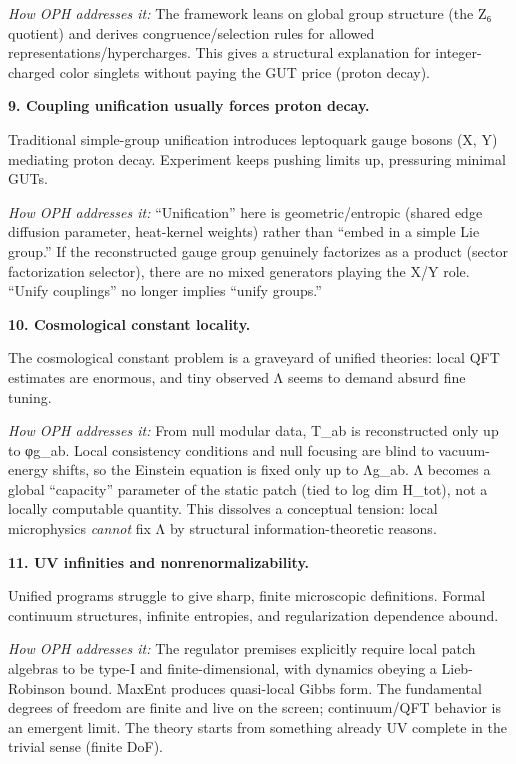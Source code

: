 \documentclass[11pt,a4paper]{article}
\theoremstyle{remark}
\begin{document}
\emph{How OPH addresses it:} The framework leans on global group structure (the Z₆ quotient) and derives congruence/selection rules for allowed representations/hypercharges. This gives a structural explanation for integer-charged color singlets without paying the GUT price (proton decay).

\textbf{9. Coupling unification usually forces proton decay.}

Traditional simple-group unification introduces leptoquark gauge bosons (X, Y) mediating proton decay. Experiment keeps pushing limits up, pressuring minimal GUTs.

\emph{How OPH addresses it:} ``Unification'' here is geometric/entropic (shared edge diffusion parameter, heat-kernel weights) rather than ``embed in a simple Lie group.'' If the reconstructed gauge group genuinely factorizes as a product (sector factorization selector), there are no mixed generators playing the X/Y role. ``Unify couplings'' no longer implies ``unify groups.''

\textbf{10. Cosmological constant locality.}

The cosmological constant problem is a graveyard of unified theories: local QFT estimates are enormous, and tiny observed Λ seems to demand absurd fine tuning.

\emph{How OPH addresses it:} From null modular data, T\_ab is reconstructed only up to φg\_ab. Local consistency conditions and null focusing are blind to vacuum-energy shifts, so the Einstein equation is fixed only up to Λg\_ab. Λ becomes a global ``capacity'' parameter of the static patch (tied to log dim H\_tot), not a locally computable quantity. This dissolves a conceptual tension: local microphysics \emph{cannot} fix Λ by structural information-theoretic reasons.

\textbf{11. UV infinities and nonrenormalizability.}

Unified programs struggle to give sharp, finite microscopic definitions. Formal continuum structures, infinite entropies, and regularization dependence abound.

\emph{How OPH addresses it:} The regulator premises explicitly require local patch algebras to be type-I and finite-dimensional, with dynamics obeying a Lieb-Robinson bound. MaxEnt produces quasi-local Gibbs form. The fundamental degrees of freedom are finite and live on the screen; continuum/QFT behavior is an emergent limit. The theory starts from something already UV complete in the trivial sense (finite DoF).
\end{document}
